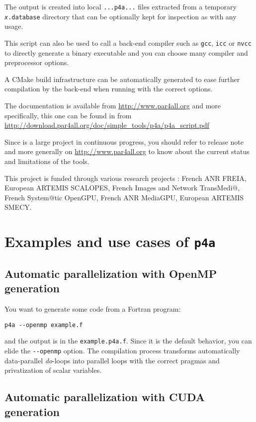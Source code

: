\documentclass[a4paper]{article}
\begin{document}
The output is created into local \texttt{...p4a...} files extracted from a
temporary \texttt{\emph{x}.database} directory that can be optionally kept
for inspection as with any \Apips usage.

This script can also be used to call a back-end compiler such as
\texttt{gcc}, \texttt{icc} or \texttt{nvcc} to directly generate a binary
executable and you can choose many compiler and preprocessor options.

A CMake build infrastructure can be automatically generated to ease
further compilation by the back-end when running with the correct options.

The \Apfa documentation is available from \url{http://www.par4all.org} and
more specifically, this one can be found in \Apdf from
\url{http://download.par4all.org/doc/simple_tools/p4a/p4a_script.pdf}

Since \Apfa is a large project in continuous progress, you should refer to
release note and more generally on \url{http://www.par4all.org} to know
about the current status and limitations of the tools.

This project is funded through various research projects : French ANR
FREIA, European ARTEMIS SCALOPES, French Images and Network TransMedi@,
French System@tic OpenGPU, French ANR MediaGPU, European ARTEMIS SMECY.


\section{Examples and use cases of \protect\texttt{p4a}}
\label{sec:examples}

\subsection{Automatic parallelization with OpenMP generation}
\label{sec:autom-parall-with}

You want to generate some \Aopenmp code from a Fortran program:
\begin{verbatim}
p4a --openmp example.f
\end{verbatim}
and the output is in the \texttt{example.p4a.f}. Since it is the default
behavior, you can elide the \verb/--openmp/ option. The compilation
process transforms automatically data-parallel \emph{do}-loops into
\Aopenmp parallel loops with the correct pragmas and privatization of
scalar variables.


\subsection{Automatic parallelization with CUDA generation}
\label{sec:autom-parall-with-1}
\end{document}
